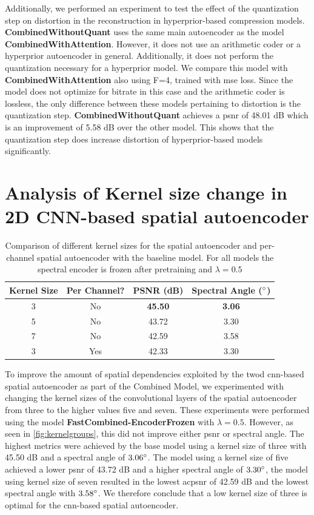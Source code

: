 Additionally, we performed an experiment to test the effect of the quantization step on distortion in the reconstruction in hyperprior-based compression models. \textbf{CombinedWithoutQuant} uses the same main autoencoder as the model \textbf{CombinedWithAttention}. However, it does not use an arithmetic coder or a hyperprior autoencoder in general. Additionally, it does not perform the quantization necessary for a hyperprior model. We compare this model with \textbf{CombinedWithAttention} also using F=4, trained with \ac{mse} loss. Since the model does not optimize for bitrate in this case and the arithmetic coder is lossless, the only difference between these models pertaining to distortion is the quantization step. \textbf{CombinedWithoutQuant} achieves a \ac{psnr} of 48.01 dB which is an improvement of 5.58 dB over the other model. This shows that the quantization step does increase distortion of hyperprior-based models significantly.

\section{Analysis of Kernel size change in 2D CNN-based spatial autoencoder}
\begin{table}
\centering
\begin{tabular}{|c|c|c|c|}
\hline
Kernel Size & Per Channel? & PSNR (dB) & Spectral Angle ($\degree$) \\
\hline\hline
3 & No & \textbf{45.50} & \textbf{3.06} \\
\hline
5 & No & 43.72 & 3.30 \\
\hline
7 & No & 42.59 & 3.58 \\
\hline
3 & Yes & 42.33 & 3.30 \\
\hline
\end{tabular}
\caption{Comparison of different kernel sizes for the spatial autoencoder and per-channel spatial autoencoder with the baseline model. For all models the spectral encoder is frozen after pretraining and $\lambda = 0.5$}
\label{fig:kernelgroups}
\end{table}

To improve the amount of spatial dependencies exploited by the \ac{twod} \ac{cnn}-based spatial autoencoder as part of the Combined Model, we experimented with changing the kernel sizes of the convolutional layers of the spatial autoencoder from three to the higher values five and seven. These experiments were performed using the model \textbf{FastCombined-EncoderFrozen} with $\lambda=0.5$. However, as seen in \autoref{fig:kernelgroups}, this did not improve either \ac{psnr} or spectral angle. The highest metrics were achieved by the base model using a kernel size of three with 45.50 dB and a spectral angle of $3.06 \degree$. The model using a kernel size of five achieved a lower \ac{psnr} of 43.72 dB and a higher spectral angle of $3.30 \degree$, the model using kernel size of seven resulted in the lowest ac{psnr} of 42.59 dB and the lowest spectral angle with $3.58 \degree$. We therefore conclude that a low kernel size of three is optimal for the \ac{cnn}-based spatial autoencoder.

